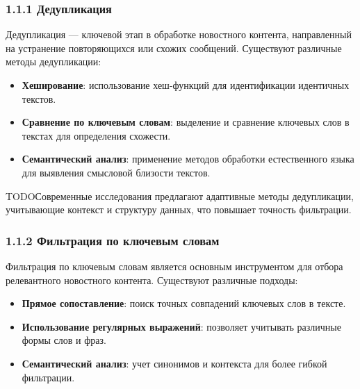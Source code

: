\hypertarget{ux434ux435ux434ux443ux43fux43bux438ux43aux430ux446ux438ux44f}{%
\subsubsection{\texorpdfstring{\textbf{1.1.1
Дедупликация}}{1.1.1 Дедупликация}}\label{ux434ux435ux434ux443ux43fux43bux438ux43aux430ux446ux438ux44f}}

Дедупликация --- ключевой этап в обработке новостного контента,
направленный на устранение повторяющихся или схожих сообщений.
Существуют различные методы дедупликации:

\begin{itemize}
\tightlist
\item
  \textbf{Хеширование}: использование хеш-функций для идентификации
  идентичных текстов.\\
\item
  \textbf{Сравнение по ключевым словам}: выделение и сравнение ключевых
  слов в текстах для определения схожести.\\
\item
  \textbf{Семантический анализ}: применение методов обработки
  естественного языка для выявления смысловой близости текстов.
\end{itemize}

TODOСовременные исследования предлагают адаптивные методы дедупликации,
учитывающие контекст и структуру данных, что повышает точность
фильтрации.

\hypertarget{ux444ux438ux43bux44cux442ux440ux430ux446ux438ux44f-ux43fux43e-ux43aux43bux44eux447ux435ux432ux44bux43c-ux441ux43bux43eux432ux430ux43c}{%
\subsubsection{\texorpdfstring{\textbf{1.1.2 Фильтрация по ключевым
словам}}{1.1.2 Фильтрация по ключевым словам}}\label{ux444ux438ux43bux44cux442ux440ux430ux446ux438ux44f-ux43fux43e-ux43aux43bux44eux447ux435ux432ux44bux43c-ux441ux43bux43eux432ux430ux43c}}

Фильтрация по ключевым словам является основным инструментом для отбора
релевантного новостного контента. Существуют различные подходы:

\begin{itemize}
\tightlist
\item
  \textbf{Прямое сопоставление}: поиск точных совпадений ключевых слов в
  тексте.\\
\item
  \textbf{Использование регулярных выражений}: позволяет учитывать
  различные формы слов и фраз.\\
\item
  \textbf{Семантический анализ}: учет синонимов и контекста для более
  гибкой фильтрации.
\end{itemize}

